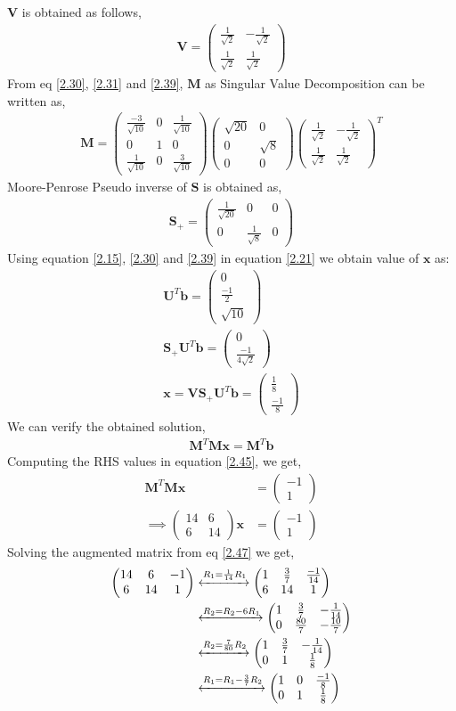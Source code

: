 \documentclass[journal,12pt,twocolumn]{IEEEtran}
\let\vec\mathbf
\numberwithin{equation}{subsection}
\newcommand{\myvec}[1]{\ensuremath{\begin{pmatrix}#1\end{pmatrix}}}
\begin{document}
 $\vec{V}$ is obtained as follows,
\begin{align}
\vec{V}=\myvec{\frac{1}{\sqrt{2}}&-\frac{1}{\sqrt{2}}\\\frac{1}{\sqrt{2}}&\frac{1}{\sqrt{2}}} \label{2.39}
\end{align}
From eq \ref{2.30}, \ref {2.31} and \ref{2.39}, $\vec{M}$ as Singular Value Decomposition can be written as,
\begin{align}
\vec{M} =\myvec{\frac{-3}{\sqrt{10}}& 0&\frac{1}{\sqrt{10}}\\0&1&0\\ \frac{1}{\sqrt{10}}&0&\frac{3}{\sqrt{10}}}\myvec{\sqrt{20}&0\\0&\sqrt{8}\\0&0} \myvec{\frac{1}{\sqrt{2}}&-\frac{1}{\sqrt{2}}\\\frac{1}{\sqrt{2}}&\frac{1}{\sqrt{2}}}^T
\end{align}
Moore-Penrose Pseudo inverse of $\vec{S}$ is obtained as,
\begin{align}
\vec{S_+} = \myvec{\frac{1}{\sqrt{20}}&0&0\\0&\frac{1}{\sqrt{8}}&0}  \label{2.41}
\end{align}
Using equation \ref{2.15}, \ref{2.30} and \ref{2.39} in equation \ref{2.21} we obtain value of $\vec{x}$ as:
\begin{align}
\vec{U}^T\vec{b}=\myvec{0 \\ \frac{-1}{2}\\ \sqrt{10}}\\
\vec{S_+}\vec{U}^T\vec{b}=\myvec{0\\ \frac{-1}{4\sqrt{2}}}\\
\vec{x} = \vec{V}\vec{S_+}\vec{U}^T\vec{b} = \myvec{\frac{1}{8}\\\frac{-1}{8}} \label{2.44}
\end{align}
We can verify the obtained solution,
\begin{align}
\vec{M}^T\vec{M}\vec{x} = \vec{M}^T\vec{b} \label{2.45}
\end{align}
Computing the RHS values in equation \ref{2.45}, we get,
\begin{align}
\vec{M}^T\vec{M}\vec{x} &= \myvec{-1\\1}\\
\implies\myvec{14&6\\6&14}\vec{x} &= \myvec{-1\\1} \label{2.47}
\end{align}
Solving the augmented matrix from eq \ref{2.47} we get,
\begin{align}
\myvec{14&6&-1\\6&14&1} &\xleftrightarrow{R_1=\frac{1}{14}R_1}\myvec{1&\frac{3}{7}&\frac{-1}{14}\\6&14&1}\\
&\xleftrightarrow{R_2=R_2-6R_1}\myvec{1&\frac{3}{7}&-\frac{1}{14}\\0&\frac{80}{7}&-\frac{10}{7}}\\
&\xleftrightarrow{R_2=\frac{7}{80}R_2}\myvec{1&\frac{3}{7}&-\frac{1}{14}\\0&1&\frac{1}{8}}\\
&\xleftrightarrow{R_1=R_1-\frac{3}{7}R_2}\myvec{1&0&\frac{-1}{8}\\0&1&\frac{1}{8}} \label{2.51}
\end{align}
\end{document}
